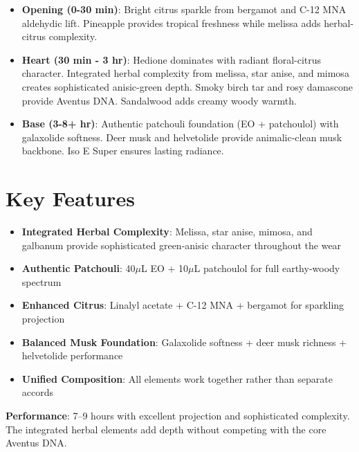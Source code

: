 \documentclass{article}
\begin{document}
\begin{itemize}
    \item \textbf{Opening (0-30 min)}: Bright citrus sparkle from bergamot and C-12 MNA aldehydic lift. Pineapple provides tropical freshness while melissa adds herbal-citrus complexity.
    
    \item \textbf{Heart (30 min - 3 hr)}: Hedione dominates with radiant floral-citrus character. Integrated herbal complexity from melissa, star anise, and mimosa creates sophisticated anisic-green depth. Smoky birch tar and rosy damascone provide Aventus DNA. Sandalwood adds creamy woody warmth.
    
    \item \textbf{Base (3-8+ hr)}: Authentic patchouli foundation (EO + patchoulol) with galaxolide softness. Deer musk and helvetolide provide animalic-clean musk backbone. Iso E Super ensures lasting radiance.
\end{itemize}

\section{Key Features}

\begin{itemize}
    \item \textbf{Integrated Herbal Complexity}: Melissa, star anise, mimosa, and galbanum provide sophisticated green-anisic character throughout the wear
    \item \textbf{Authentic Patchouli}: 40$\mu$L EO + 10$\mu$L patchoulol for full earthy-woody spectrum
    \item \textbf{Enhanced Citrus}: Linalyl acetate + C-12 MNA + bergamot for sparkling projection
    \item \textbf{Balanced Musk Foundation}: Galaxolide softness + deer musk richness + helvetolide performance
    \item \textbf{Unified Composition}: All elements work together rather than separate accords
\end{itemize}

\textbf{Performance}: 7--9 hours with excellent projection and sophisticated complexity. The integrated herbal elements add depth without competing with the core Aventus DNA.
\end{document}
